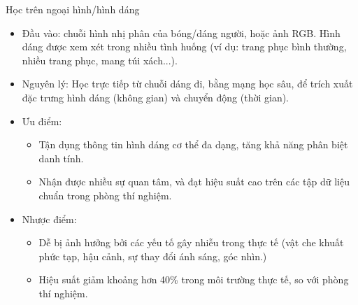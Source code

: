 \begin{frame}{Học trên ngoại hình/hình dáng}
    \begin{itemize}
        \item Đầu vào: chuỗi hình nhị phân của bóng/dáng người, hoặc ảnh RGB. Hình dáng được xem xét trong nhiều tình huống (ví dụ: trang phục bình thường, nhiều trang phục, mang túi xách...).
        \item Nguyên lý: Học trực tiếp từ chuỗi dáng đi, bằng mạng học sâu, để trích xuất đặc trưng hình dáng (không gian) và chuyển động (thời gian).
        \item Ưu điểm:
              \begin{itemize}
                  \item Tận dụng thông tin hình dáng cơ thể đa dạng, tăng khả năng phân biệt danh tính.
                  \item Nhận được nhiều sự quan tâm, và đạt hiệu suất cao trên các tập dữ liệu chuẩn trong phòng thí nghiệm.
              \end{itemize}
        \item Nhược điểm:
              \begin{itemize}
                  \item Dễ bị ảnh hưởng bởi các yếu tố gây nhiễu trong thực tế (vật che khuất phức tạp, hậu cảnh, sự thay đổi ánh sáng, góc nhìn.)
                  \item Hiệu suất giảm khoảng hơn 40\% trong môi trường thực tế, so với phòng thí nghiệm.
              \end{itemize}
    \end{itemize}
\end{frame}



